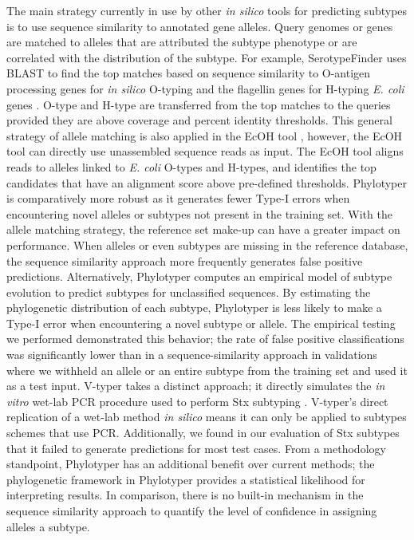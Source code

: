 \documentclass{bioinfo}
\begin{document}
The main strategy currently in use by other \textit{in silico} tools for predicting subtypes is to use sequence similarity to annotated gene alleles.
Query genomes or genes are matched to alleles that are attributed the subtype phenotype or are correlated with the distribution of the subtype.
For example, SerotypeFinder uses BLAST to find the top matches based on sequence similarity to O-antigen processing genes for \textit{in silico} O-typing and the flagellin genes for H-typing \textit{E. coli} genes \citep{Jenkins2015}.  
O-type and H-type are transferred from the top matches to the queries provided they are above coverage and percent identity thresholds.
This general strategy of allele matching is also applied in the EcOH tool \citep{Ingle2016}, however, the EcOH tool can directly use unassembled sequence reads as input. The EcOH tool aligns reads to alleles linked to \textit{E. coli} O-types and H-types, and identifies the top candidates that have an alignment score above pre-defined thresholds.
Phylotyper is comparatively more robust as it generates fewer Type-I errors when encountering novel alleles or subtypes not present in the training set.
With the allele matching strategy, the reference set make-up can have a greater impact on performance.
When alleles or even subtypes are missing in the reference database, the sequence similarity approach more frequently generates false positive predictions.
Alternatively, Phylotyper computes an empirical model of subtype evolution to predict subtypes for unclassified sequences.
By estimating the phylogenetic distribution of each subtype, Phylotyper is less likely to make a Type-I error when encountering a novel subtype or allele. 
The empirical testing we performed demonstrated this behavior; 
the rate of false positive classifications was significantly lower than in a sequence-similarity approach in validations where we withheld an allele or an entire subtype from the training set and used it as a test input.
V-typer takes a distinct approach; it directly simulates the \textit{in vitro} wet-lab PCR procedure used to perform Stx subtyping \citep{CARRILLO2016}. 
V-typer's direct replication of a wet-lab method \textit{in silico} means it can only be applied to subtypes schemes that use PCR. 
Additionally, we found in our evaluation of Stx subtypes that it failed to generate predictions for most test cases.
From a methodology standpoint, Phylotyper has an additional benefit over current methods; the phylogenetic framework in Phylotyper provides a statistical likelihood for interpreting results.
In comparison, there is no built-in mechanism in the sequence similarity approach to quantify the level of confidence in assigning alleles a subtype.
\end{document}
